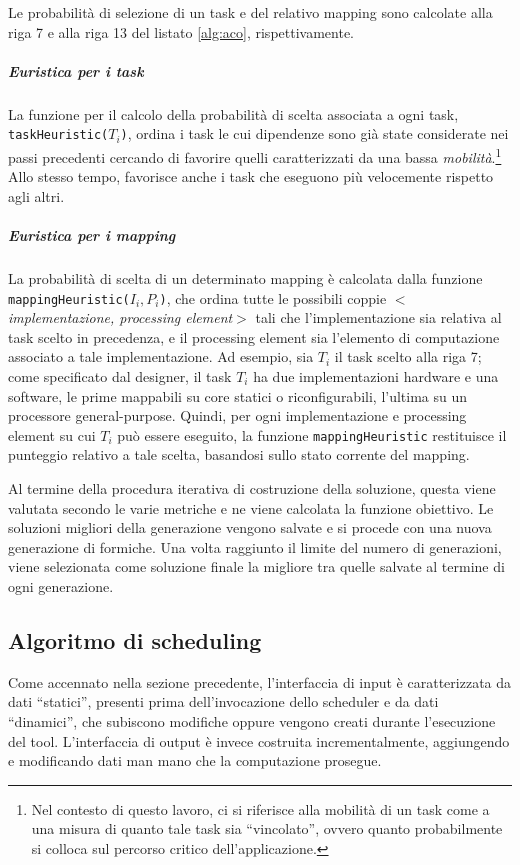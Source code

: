 Le probabilit\`a di selezione di un task e del relativo mapping sono calcolate alla riga 7 e alla riga
13 del listato \ref{alg:aco}, rispettivamente.

\subparagraph{Euristica per i task}
La funzione per il calcolo della probabilit\`a di scelta associata a ogni task,
\verb+taskHeuristic(+$T_i$\verb+)+, ordina i task le cui dipendenze sono gi\`a state
considerate nei passi precedenti cercando di favorire quelli caratterizzati da una bassa
\emph{mobilit\`a}.\footnote{Nel contesto di questo lavoro, ci si riferisce alla mobilit\`a di un
  task come a una misura di quanto tale task sia ``vincolato'', ovvero quanto probabilmente
si colloca sul percorso critico dell'applicazione.}
Allo stesso tempo, favorisce anche i task che eseguono pi\`u velocemente rispetto agli altri.

\subparagraph{Euristica per i mapping}
La probabilit\`a di scelta di un determinato mapping \`e calcolata dalla funzione
\verb+mappingHeuristic(+$I_i, P_i$\verb+)+, che ordina tutte le possibili coppie
$<$\emph{implementazione, processing element}$>$ tali che l'implementazione sia relativa
al task scelto in precedenza, e il processing element sia l'elemento di computazione associato
a tale implementazione. Ad esempio, sia $T_i$ il task scelto alla riga 7; come specificato
dal designer, il task $T_i$ ha due implementazioni hardware e una software, le prime
mappabili su core statici o riconfigurabili, l'ultima su un processore general-purpose.
Quindi, per ogni implementazione e processing element su cui $T_i$ pu\`o essere eseguito,
la funzione \verb+mappingHeuristic+ restituisce il punteggio relativo a tale scelta,
basandosi sullo stato corrente del mapping.

Al termine della procedura iterativa di costruzione della soluzione, questa viene valutata
secondo le varie metriche e ne viene calcolata la funzione obiettivo. Le soluzioni migliori
della generazione vengono salvate e si procede con una nuova generazione di formiche.
Una volta raggiunto il limite del numero di generazioni, viene selezionata come
soluzione finale la migliore tra quelle salvate al termine di ogni generazione.

\subsection{Algoritmo di scheduling}
Come accennato nella sezione precedente, l'interfaccia di input è 
caratterizzata da dati ``statici'', presenti prima dell'invocazione dello 
scheduler e da dati ``dinamici'', che subiscono modifiche oppure vengono creati 
durante l'esecuzione del tool. L'interfaccia di output è invece costruita 
incrementalmente, aggiungendo e modificando dati man mano che la computazione 
prosegue.


